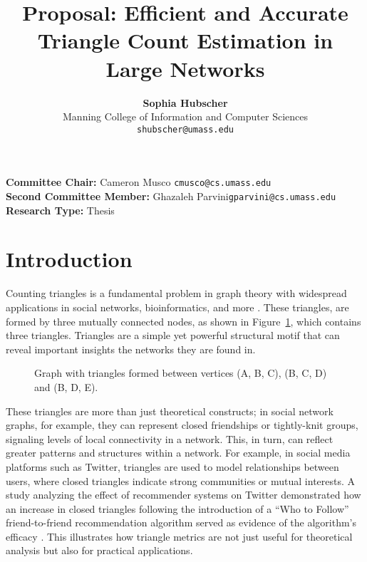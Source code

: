 \documentclass[11pt]{article}
\title{Proposal: Efficient and Accurate Triangle Count Estimation in Large Networks}
\date{}
\author{
  \textbf{Sophia Hubscher}\\
  Manning College of Information and Computer Sciences\\
  \texttt{shubscher@umass.edu}\\
}
\begin{document}
\maketitle

\noindent\textbf{Committee Chair: }Cameron Musco
\;\;\;\texttt{cmusco@cs.umass.edu} \\
\textbf{Second Committee Member: } Ghazaleh Parvini\;\;\;\texttt{gparvini@cs.umass.edu} \\
\textbf{Research Type: } Thesis \\

\section{Introduction}

Counting triangles is a fundamental problem in graph theory with widespread applications in social networks, bioinformatics, and more \cite{lovasz_large_2012}.
These triangles, are formed by three mutually connected nodes, as shown in Figure~\ref{fig:triangles}, which contains three triangles.
Triangles are a simple yet powerful structural motif that can reveal important insights the networks they are found in.

\begin{figure}[H]
    \centering
    \begin{minipage}{0.45\textwidth}
        \caption{Graph with triangles formed between vertices (A, B, C), (B, C, D) and (B, D, E).}
        \label{fig:triangles}
    \end{minipage}%
\end{figure}

These triangles are more than just theoretical constructs; in social network graphs, for example, they can represent closed friendships or tightly-knit groups, signaling levels of local connectivity in a network.
This, in turn, can reflect greater patterns and structures within a network.
For example, in social media platforms such as Twitter, triangles are used to model relationships between users, where closed triangles indicate strong communities or mutual interests.
A study analyzing the effect of recommender systems on Twitter demonstrated how an increase in closed triangles following the introduction of a ``Who to Follow'' friend-to-friend recommendation algorithm served as evidence of the algorithm's efficacy \cite{su_effect_2016}.
This illustrates how triangle metrics are not just useful for theoretical analysis but also for practical applications.
\end{document}
